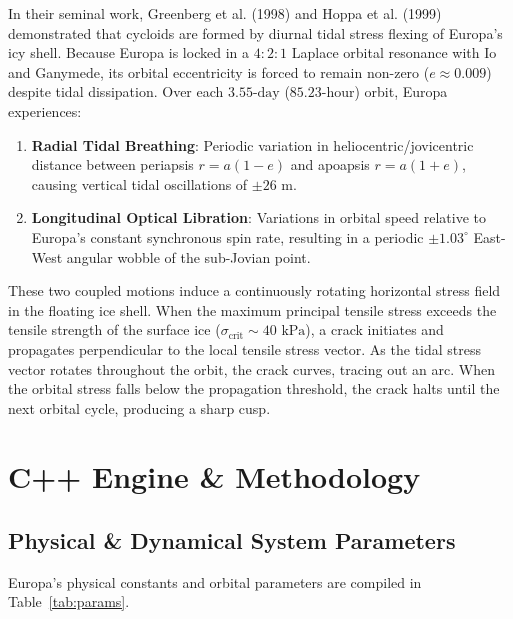 \documentclass[11pt,a4paper]{article}
\begin{document}
In their seminal work, Greenberg et al. (1998) and Hoppa et al. (1999) demonstrated that cycloids are formed by diurnal tidal stress flexing of Europa's icy shell. Because Europa is locked in a $4:2:1$ Laplace orbital resonance with Io and Ganymede, its orbital eccentricity is forced to remain non-zero ($e \approx 0.009$) despite tidal dissipation. Over each $3.55\text{-day}$ ($85.23\text{-hour}$) orbit, Europa experiences:
\begin{enumerate}
    \item \textbf{Radial Tidal Breathing}: Periodic variation in heliocentric/jovicentric distance between periapsis $r = a(1-e)$ and apoapsis $r = a(1+e)$, causing vertical tidal oscillations of $\pm 26\text{ m}$.
    \item \textbf{Longitudinal Optical Libration}: Variations in orbital speed relative to Europa's constant synchronous spin rate, resulting in a periodic $\pm 1.03^\circ$ East-West angular wobble of the sub-Jovian point.
\end{enumerate}

These two coupled motions induce a continuously rotating horizontal stress field in the floating ice shell. When the maximum principal tensile stress exceeds the tensile strength of the surface ice ($\sigma_{\mathrm{crit}} \sim 40\text{ kPa}$), a crack initiates and propagates perpendicular to the local tensile stress vector. As the tidal stress vector rotates throughout the orbit, the crack curves, tracing out an arc. When the orbital stress falls below the propagation threshold, the crack halts until the next orbital cycle, producing a sharp cusp.

\section{C++ Engine \& Methodology}
\subsection{Physical \& Dynamical System Parameters}
Europa's physical constants and orbital parameters are compiled in Table~\ref{tab:params}.
\end{document}

